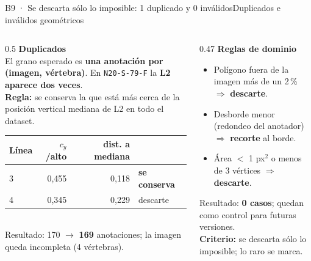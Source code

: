 \documentclass[aspectratio=169,10pt]{beamer}
\begin{document}
\begin{frame}{B9 · Se descarta sólo lo imposible: 1 duplicado y 0 inválidos}{Duplicados e inválidos geométricos}
  \begin{columns}[T]
    \begin{column}{0.5\textwidth}
      \textbf{\color{itba}Duplicados}\\[0.5ex]
      \small
      El grano esperado es \textbf{una anotación por (imagen, vértebra)}. En \texttt{N20-S-79-F} la \textbf{L2 aparece dos veces}.\\[0.8ex]
      \textbf{Regla:} se conserva la que está más cerca de la posición vertical mediana de L2 en todo el dataset.\\[0.6ex]
      \footnotesize
      \begin{tabular}{@{}lrrl@{}}
        \toprule
        Línea & $c_y$/alto & dist. a mediana & \\ \midrule
        3 & 0{,}455 & 0{,}118 & \textbf{se conserva} \\
        4 & 0{,}345 & 0{,}229 & descarte \\ \bottomrule
      \end{tabular}\\[0.6ex]
      \small Resultado: 170 $\rightarrow$ \textbf{169} anotaciones; la imagen queda incompleta (4 vértebras).
    \end{column}
    \begin{column}{0.47\textwidth}
      \textbf{\color{itba}Reglas de dominio}\\[0.5ex]
      \small
      \begin{itemize}\setlength{\itemsep}{0.5ex}
        \item Polígono fuera de la imagen más de un 2\,\% $\Rightarrow$ \textbf{descarte}.
        \item Desborde menor (redondeo del anotador) $\Rightarrow$ \textbf{recorte} al borde.
        \item Área $<$ 1 px$^2$ o menos de 3 vértices $\Rightarrow$ \textbf{descarte}.
      \end{itemize}
      \vspace{0.5ex}
      Resultado: \textbf{0 casos}; quedan como control para futuras versiones.\\[0.8ex]
      {\color{itba}\textbf{Criterio:} se descarta sólo lo imposible; lo raro se marca.}
    \end{column}
  \end{columns}
\end{frame}
\end{document}
